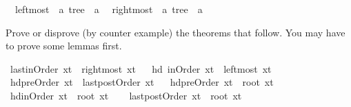\begin{isabellebody}
\ \ leftmost\ {\isacharcolon}{\isacharcolon}\ {\isachardoublequote}{\isacharprime}a\ tree\ {\isasymRightarrow}\ {\isacharprime}a{\isachardoublequote}\isanewline
\ \ rightmost\ {\isacharcolon}{\isacharcolon}\ {\isachardoublequote}{\isacharprime}a\ tree\ {\isasymRightarrow}\ {\isacharprime}a{\isachardoublequote}\isamarkupfalse%
%
\begin{isamarkuptext}%
Prove or disprove (by counter example) the theorems that follow. You may have to prove some lemmas first.%
\end{isamarkuptext}%
\isamarkuptrue%
\ {\isachardoublequote}last{\isacharparenleft}inOrder\ xt{\isacharparenright}\ {\isacharequal}\ rightmost\ xt{\isachardoublequote}\isamarkupfalse%
\ \isanewline
\isamarkupfalse%
\ {\isachardoublequote}hd\ {\isacharparenleft}inOrder\ xt{\isacharparenright}\ {\isacharequal}\ leftmost\ xt\ {\isachardoublequote}\isamarkupfalse%
\ \isanewline
\isamarkupfalse%
\ {\isachardoublequote}hd{\isacharparenleft}preOrder\ xt{\isacharparenright}\ {\isacharequal}\ last{\isacharparenleft}postOrder\ xt{\isacharparenright}{\isachardoublequote}\isamarkupfalse%
\ \isanewline
\isamarkupfalse%
\ {\isachardoublequote}hd{\isacharparenleft}preOrder\ xt{\isacharparenright}\ {\isacharequal}\ root\ xt{\isachardoublequote}\isamarkupfalse%
\ \isanewline
\isamarkupfalse%
\ {\isachardoublequote}hd{\isacharparenleft}inOrder\ xt{\isacharparenright}\ {\isacharequal}\ root\ xt\ {\isachardoublequote}\isamarkupfalse%
\ \isanewline
\isamarkupfalse%
\ {\isachardoublequote}last{\isacharparenleft}postOrder\ xt{\isacharparenright}\ {\isacharequal}\ root\ xt{\isachardoublequote}\isamarkupfalse%
\ \isanewline
\isanewline
\isamarkupfalse%
\isamarkupfalse%
\end{isabellebody}%
